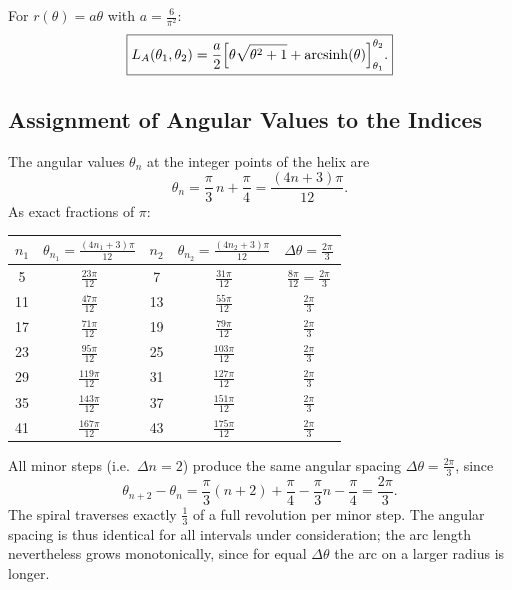 \begin{satz}
\label{satz:bogenlaenge_geschlossen}
For $r(\theta) = a\theta$ with $a = \frac{6}{\pi^2}$:
\begin{equation}
\boxed{
L_A(\theta_1, \theta_2)
= \frac{a}{2}\Bigl[\theta\sqrt{\theta^2+1} + \operatorname{arcsinh}(\theta)\Bigr]_{\theta_1}^{\theta_2}.
}
\end{equation}
\end{satz}

\subsection{Assignment of Angular Values to the Indices}

The angular values $\theta_n$ at the integer points of the helix are
\[
\theta_n = \frac{\pi}{3}\,n + \frac{\pi}{4} = \frac{(4n+3)\pi}{12}.
\]
As exact fractions of $\pi$:

\begin{center}
\begin{tabular}{ccccc}
\toprule
$n_1$ & $\theta_{n_1} = \frac{(4n_1+3)\pi}{12}$ & $n_2$ & $\theta_{n_2} = \frac{(4n_2+3)\pi}{12}$ & $\Delta\theta = \frac{2\pi}{3}$ \\
\midrule
 5 & $\frac{23\pi}{12}$ &  7 & $\frac{31\pi}{12}$ & $\frac{8\pi}{12} = \frac{2\pi}{3}$ \\
11 & $\frac{47\pi}{12}$ & 13 & $\frac{55\pi}{12}$ & $\frac{2\pi}{3}$ \\
17 & $\frac{71\pi}{12}$ & 19 & $\frac{79\pi}{12}$ & $\frac{2\pi}{3}$ \\
23 & $\frac{95\pi}{12}$ & 25 & $\frac{103\pi}{12}$ & $\frac{2\pi}{3}$ \\
29 & $\frac{119\pi}{12}$ & 31 & $\frac{127\pi}{12}$ & $\frac{2\pi}{3}$ \\
35 & $\frac{143\pi}{12}$ & 37 & $\frac{151\pi}{12}$ & $\frac{2\pi}{3}$ \\
41 & $\frac{167\pi}{12}$ & 43 & $\frac{175\pi}{12}$ & $\frac{2\pi}{3}$ \\
\bottomrule
\end{tabular}
\end{center}

\begin{bemerkung}
All minor steps (i.e.\ $\Delta n = 2$) produce the same angular spacing
$\Delta\theta = \frac{2\pi}{3}$, since
\[
  \theta_{n+2} - \theta_n
  = \frac{\pi}{3}(n+2) + \frac{\pi}{4} - \frac{\pi}{3}n - \frac{\pi}{4}
  = \frac{2\pi}{3}.
\]
The spiral traverses exactly $\frac{1}{3}$ of a full revolution per minor step.
The angular spacing is thus identical for all intervals under consideration;
the arc length nevertheless grows monotonically, since for equal $\Delta\theta$
the arc on a larger radius is longer.
\end{bemerkung}


